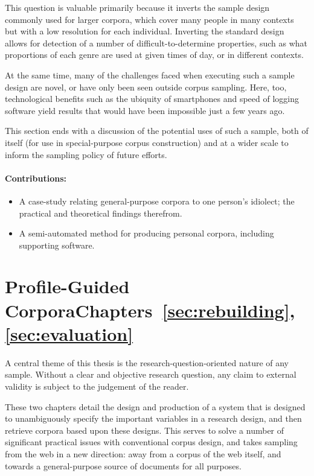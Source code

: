 This question is valuable primarily because it inverts the sample design commonly used for larger corpora, which cover many people in many contexts but with a low resolution for each individual.
Inverting the standard design allows for detection of a number of difficult-to-determine properties, such as what proportions of each genre are used at given times of day, or in different contexts.

At the same time, many of the challenges faced when executing such a sample design are novel, or have only been seen outside corpus sampling.  Here, too, technological benefits such as the ubiquity of smartphones and speed of logging software yield results that would have been impossible just a few years ago.

This section ends with a discussion of the potential uses of such a sample, both of itself (for use in special-purpose corpus construction) and at a wider scale to inform the sampling policy of future efforts.

\paragraph{Contributions:}
\begin{itemize}
    \item A case-study relating general-purpose corpora to one person's idiolect; the practical and theoretical findings therefrom.
    \item A semi-automated method for producing personal corpora, including supporting software.
\end{itemize}


\section*{Profile-Guided Corpora\hfill{}Chapters~\ref{sec:rebuilding},~\ref{sec:evaluation}}
A central theme of this thesis is the research-question-oriented nature of any sample.  Without a clear and objective research question, any claim to external validity is subject to the judgement of the reader.

These two chapters detail the design and production of a system that is designed to unambiguously specify the important variables in a research design, and then retrieve corpora based upon these designs.  This serves to solve a number of significant practical issues with conventional corpus design, and takes sampling from the web in a new direction: away from a corpus of the web itself, and towards a general-purpose source of documents for all purposes.

